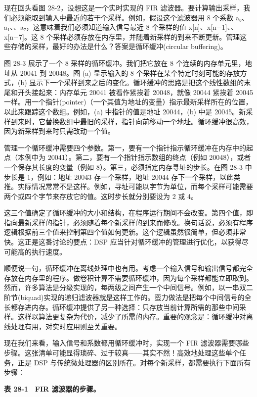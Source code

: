 现在回头看图 28-2，设想这是一个实时实现的 FIR
滤波器。要计算输出采样，我们必须能取到输入中最近的若干个采样。例如，假设这个滤波器用
8 个系数 a₀、a₁、、a₇，这意味着我们必须知道输入信号最近 8
个采样的值 x{[}n{]}、x{[}n−1{]}、、x{[}n−7{]}。这 8
个采样必须存放在内存里，并随着新采样的到来不断更新。管理这些存储的采样，最好的办法是什么？答案是循环缓冲(circular
buffering)。

图 28-3 展示了一个 8 采样的循环缓冲。我们把它放在 8
个连续的内存单元里，地址从 20041 到 20048。图 (a) 显示输入的 8
个采样在某个特定时刻可能的存放方式，(b)
显示下一个采样到来之后的变化。循环缓冲的思路是把这个线性数组的末尾和开头接起来：内存单元
20041 被看作紧挨着 20048，就像 20044 紧挨着 20045
一样。用一个指针(pointer)（一个其值为地址的变量）指示最新采样所在的位置，以此来跟踪这个数组。例如，(a)
中指针的值是地址 20044，(b) 中是
20045。新采样到来时，它替换数组中最旧的采样，指针向前移动一个地址。循环缓冲很高效，因为新采样到来时只需改动一个值。

管理一个循环缓冲需要四个参数。第一，要有一个指针指示循环缓冲在内存中的起点（本例中为
20041）。第二，要有一个指针指示数组的终点（例如
20048），或者一个保存其长度的变量（例如
8）。第三，必须指定内存寻址的步长。在图 28-3 中步长是 1，例如：地址
20043 存一个采样，地址 20044
存下一个采样，以此类推。实际情况常常不是这样。例如，寻址可能以字节为单位，而每个采样可能需要两个或四个字节来存放它的值。这时步长就分别要设为
2 或 4。

这三个值确定了循环缓冲的大小和结构，在程序运行期间不会改变。第四个值，即指向最新采样的指针，必须随着每个新采样的到来而修改。换句话说，必须有程序逻辑根据前三个值来控制第四个值如何更新。这个逻辑虽然很简单，但必须非常快。这正是这番讨论的要点：DSP
应当针对循环缓冲的管理进行优化，以获得尽可能高的执行速度。

顺便说一句，循环缓冲在离线处理中也有用。考虑一个输入信号和输出信号都完全存放在内存里的程序。做卷积计算不需要循环缓冲，因为每个采样都能立即取到。然而，许多算法是分级实现的，每两级之间产生一个中间信号。例如，以一串双二阶节(biquad)实现的递归滤波器就是这样工作的。蛮力做法是把每个中间信号的全长都存进内存。循环缓冲提供了另一种选择：只存放当前计算所需的那些中间采样。这样以算法更复杂为代价，减少了所需的内存。重要的观念是：循环缓冲对离线处理有用，对实时应用则至关重要。

现在我们来看，输入信号和系数都用循环缓冲时，实现一个 FIR
滤波器需要哪些步骤。这张清单可能显得琐碎、过于较真------其实不然！高效地处理这些单个任务，正是
DSP 与传统微处理器的区别所在。对每个新采样，都需要执行下面所有步骤：

\textbf{表 28-1　FIR 滤波器的步骤。}

